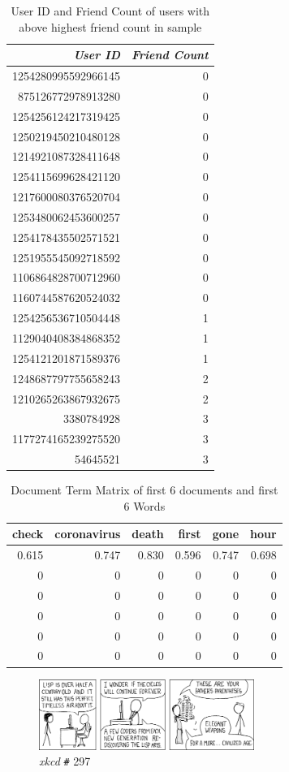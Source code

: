 \documentclass[11pt]{article}
\begin{document}
\begin{table}[htbp]
\caption{\label{tab:orga1e27df}User ID and Friend Count of users with above highest friend count in sample}
\centering
\begin{tabular}{rr}
\textbf{\emph{User ID}} & \textbf{\emph{Friend Count}}\\
\hline
1254280995592966145 & 0\\
875126772978913280 & 0\\
1254256124217319425 & 0\\
1250219450210480128 & 0\\
1214921087328411648 & 0\\
1254115699628421120 & 0\\
1217600080376520704 & 0\\
1253480062453600257 & 0\\
1254178435502571521 & 0\\
1251955545092718592 & 0\\
1106864828700712960 & 0\\
1160744587620524032 & 0\\
1254256536710504448 & 1\\
1129040408384868352 & 1\\
1254121201871589376 & 1\\
1248687797755658243 & 2\\
1210265263867932675 & 2\\
3380784928 & 3\\
1177274165239275520 & 3\\
54645521 & 3\\
\end{tabular}
\end{table}



\begin{table}[htbp]
\caption{\label{tab:org7045808}Document Term Matrix of first 6 documents and first 6 Words}
\centering
\begin{tabular}{rrrrrr}
\textbf{\textbf{check}} & \textbf{\textbf{coronavirus}} & \textbf{\textbf{death}} & \textbf{\textbf{first}} & \textbf{\textbf{gone}} & \textbf{\textbf{hour}}\\
\hline
0.615 & 0.747 & 0.830 & 0.596 & 0.747 & 0.698\\
0 & 0 & 0 & 0 & 0 & 0\\
0 & 0 & 0 & 0 & 0 & 0\\
0 & 0 & 0 & 0 & 0 & 0\\
0 & 0 & 0 & 0 & 0 & 0\\
0 & 0 & 0 & 0 & 0 & 0\\
\end{tabular}
\end{table}

\begin{figure}[htbp]
\centering
\includegraphics[width=7cm]{./Figures/lisp_cycles.png}
\caption{\label{fig:orgd0c4274}\emph{xkcd} \texttt{\#} 297}
\end{figure}
\end{document}
